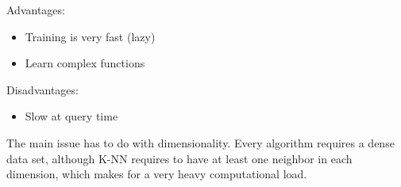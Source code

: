 \documentclass[oneside]{book}
\theoremstyle{definition}
\begin{document}
Advantages:

\begin{itemize}
	\item Training is very fast (lazy)
	\item Learn complex functions
\end{itemize}

Disadvantages:

\begin{itemize}
	\item Slow at query time
\end{itemize}





The main issue has to do with dimensionality. Every algorithm requires a dense data set, although K-NN requires to have at least one neighbor in each dimension, which makes for a very heavy computational load.









\end{document}
